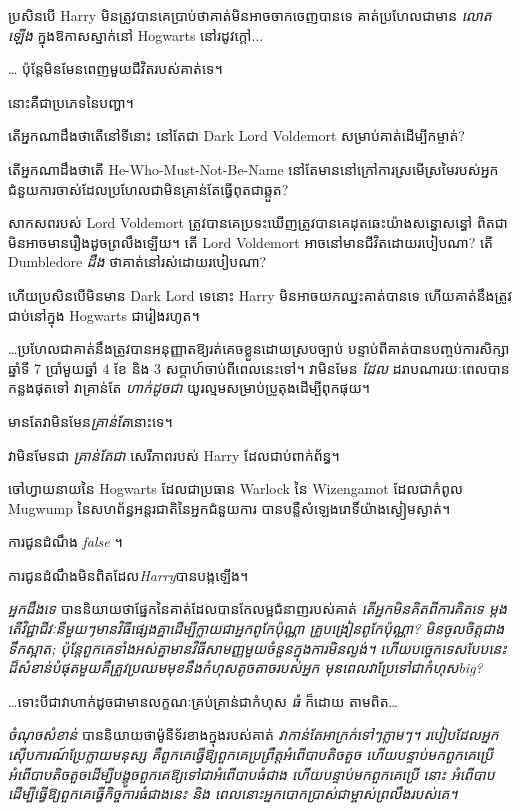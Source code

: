 {{{{{{ប្រសិនបើ Harry មិនត្រូវបានគេប្រាប់ថាគាត់មិនអាចចាកចេញបានទេ គាត់ប្រហែលជាមាន \emph{លោតឡើង} ក្នុងឱកាសស្នាក់នៅ Hogwarts នៅរដូវក្តៅ...

… ប៉ុន្តែមិនមែនពេញមួយជីវិតរបស់គាត់ទេ។

នោះគឺជាប្រភេទនៃបញ្ហា។

តើអ្នកណាដឹងថាតើនៅទីនោះ \emph{} នៅតែជា Dark Lord Voldemort សម្រាប់គាត់ដើម្បីកម្ចាត់?

តើអ្នកណាដឹងថាតើ He-Who-Must-Not-Be-Name នៅតែមាននៅក្រៅការស្រមើស្រមៃរបស់អ្នកជំនួយការចាស់ដែលប្រហែលជាមិនគ្រាន់តែធ្វើពុតជាឆ្កួត?

សាកសព​របស់ Lord Voldemort ត្រូវ​បាន​គេ​ប្រទះ​ឃើញ​ត្រូវ​បាន​គេ​ដុត​ឆេះ​យ៉ាង​សន្ធោសន្ធៅ ពិត​ជា​មិន​អាច​មាន​រឿង​ដូច​ព្រលឹង​ឡើយ។ តើ Lord Voldemort អាចនៅមានជីវិតដោយរបៀបណា? តើ Dumbledore \emph{ដឹង} ថាគាត់នៅរស់ដោយរបៀបណា?

ហើយប្រសិនបើមិនមាន Dark Lord ទេនោះ Harry មិនអាចយកឈ្នះគាត់បានទេ ហើយគាត់នឹងត្រូវជាប់នៅក្នុង Hogwarts ជារៀងរហូត។

…ប្រហែលជាគាត់នឹងត្រូវបានអនុញ្ញាតឱ្យរត់គេចខ្លួនដោយស្របច្បាប់ បន្ទាប់ពីគាត់បានបញ្ចប់ការសិក្សាឆ្នាំទី 7 ប្រាំមួយឆ្នាំ 4 ខែ និង 3 សប្តាហ៍ចាប់ពីពេលនេះទៅ។ វាមិនមែន \emph{ដែល} ដរាបណារយៈពេលបានកន្លងផុតទៅ វាគ្រាន់តែ \emph{ ហាក់ដូចជា} យូរល្មមសម្រាប់ប្រូតុងដើម្បីពុកផុយ។

មានតែវាមិនមែន\emph{គ្រាន់តែ}នោះទេ។

វាមិនមែនជា \emph{គ្រាន់តែជា} សេរីភាពរបស់ Harry ដែលជាប់ពាក់ព័ន្ធ។

ចៅហ្វាយនាយនៃ Hogwarts ដែលជាប្រធាន Warlock នៃ Wizengamot ដែលជាកំពូល Mugwump នៃសហព័ន្ធអន្តរជាតិនៃអ្នកជំនួយការ បានបន្លឺសំឡេងរោទិ៍យ៉ាងស្ងៀមស្ងាត់។

ការជូនដំណឹង \emph{false} ។

ការជូនដំណឹងមិនពិតដែល\emph{Harry}បានបង្កឡើង។

\emph{អ្នកដឹងទេ} បាននិយាយថាផ្នែកនៃគាត់ដែលបានកែលម្អជំនាញរបស់គាត់ \emph{តើអ្នកមិនគិតពីការគិតទេ ម្តង តើវិជ្ជាជីវៈនីមួយៗមានវិធីផ្សេងគ្នាដើម្បីក្លាយជាអ្នកពូកែប៉ុណ្ណា គ្រូបង្រៀនពូកែប៉ុណ្ណា? មិនចូលចិត្តជាងទឹកស្អាត; ប៉ុន្តែពួកគេទាំងអស់គ្នាមានវិធីសាមញ្ញមួយចំនួនក្នុងការមិនល្ងង់។ ហើយបច្ចេកទេសបែបនេះដ៏សំខាន់បំផុតមួយគឺត្រូវប្រឈមមុខនឹងកំហុសតូចតាចរបស់អ្នក មុនពេលវាប្រែទៅជាកំហុស\emph{big}?}

…ទោះបីជាវាហាក់ដូចជាមានលក្ខណៈគ្រប់គ្រាន់ជាកំហុស \emph{ធំ} ក៏ដោយ តាមពិត…

\emph{ចំណុចសំខាន់} បាននិយាយថាម៉ូនីទ័រខាងក្នុងរបស់គាត់ \emph{វាកាន់តែអាក្រក់ទៅៗភ្លាមៗ។ របៀបដែលអ្នកស៊ើបការណ៍ប្រែក្លាយមនុស្ស គឺពួកគេធ្វើឱ្យពួកគេប្រព្រឹត្តអំពើបាបតិចតួច ហើយបន្ទាប់មកពួកគេប្រើអំពើបាបតិចតួចដើម្បីបង្ខូចពួកគេឱ្យទៅជាអំពើបាបធំជាង ហើយបន្ទាប់មកពួកគេប្រើ \emph{នោះ} អំពើបាបដើម្បីធ្វើឱ្យពួកគេធ្វើកិច្ចការធំជាងនេះ និង ពេលនោះអ្នកបោកប្រាស់ជាម្ចាស់ព្រលឹងរបស់គេ។}

}}}}}}
